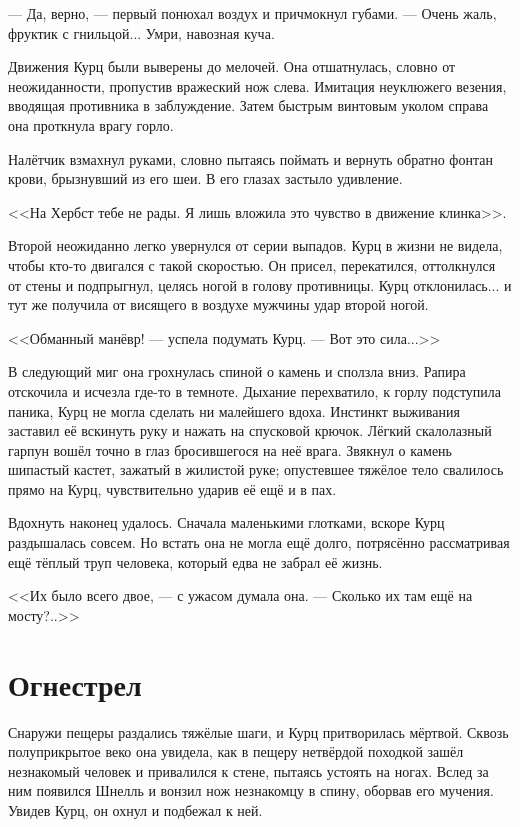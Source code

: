 \documentclass[a4paper,10pt,fleqn]{book}\usepackage{polyglossia}\setdefaultlanguage{english}\setotherlanguage{russian}\defaultfontfeatures{Ligatures=TeX,Mapping=tex-text}\usepackage{xcolor}\definecolor{lightgray}{HTML}{bbbbbb}\color{lightgray}\newcommand{\ml}[3]{\textcolor{black}{#3}}
\begin{document}
--- Да, верно, --- первый понюхал воздух и причмокнул губами.
--- Очень жаль, фруктик с гнильцой...
Умри, навозная куча.

Движения Курц были выверены до мелочей.
Она отшатнулась, словно от неожиданности, пропустив вражеский нож слева.
Имитация неуклюжего везения, вводящая противника в заблуждение.
Затем быстрым винтовым уколом справа она проткнула врагу горло.

Налётчик взмахнул руками, словно пытаясь поймать и вернуть обратно фонтан крови, брызнувший из его шеи.
В его глазах застыло удивление.

<<На Хербст тебе не рады.
Я лишь вложила это чувство в движение клинка>>.

Второй неожиданно легко увернулся от серии выпадов.
Курц в жизни не видела, чтобы кто-то двигался с такой скоростью.
Он присел, перекатился, оттолкнулся от стены и подпрыгнул, целясь ногой в голову противницы.
Курц отклонилась... и тут же получила от висящего в воздухе мужчины удар второй ногой.

<<Обманный манёвр! --- успела подумать Курц.
--- Вот это сила...>>

В следующий миг она грохнулась спиной о камень и сползла вниз.
Рапира отскочила и исчезла где-то в темноте.
Дыхание перехватило, к горлу подступила паника, Курц не могла сделать ни малейшего вдоха.
Инстинкт выживания заставил её вскинуть руку и нажать на спусковой крючок.
Лёгкий скалолазный гарпун вошёл точно в глаз бросившегося на неё врага.
Звякнул о камень шипастый кастет, зажатый в жилистой руке;
опустевшее тяжёлое тело свалилось прямо на Курц, чувствительно ударив её ещё и в пах.

Вдохнуть наконец удалось.
Сначала маленькими глотками, вскоре Курц раздышалась совсем.
Но встать она не могла ещё долго, потрясённо рассматривая ещё тёплый труп человека, который едва не забрал её жизнь.

<<Их было всего двое, --- с ужасом думала она.
--- Сколько их там ещё на мосту?..>>

\section{Огнестрел}

Снаружи пещеры раздались тяжёлые шаги, и Курц притворилась мёртвой.
Сквозь полуприкрытое веко она увидела, как в пещеру нетвёрдой походкой зашёл незнакомый человек и привалился к стене, пытаясь устоять на ногах.
Вслед за ним появился Шнелль и вонзил нож незнакомцу в спину, оборвав его мучения.
Увидев Курц, он охнул и подбежал к ней.
\end{document}
